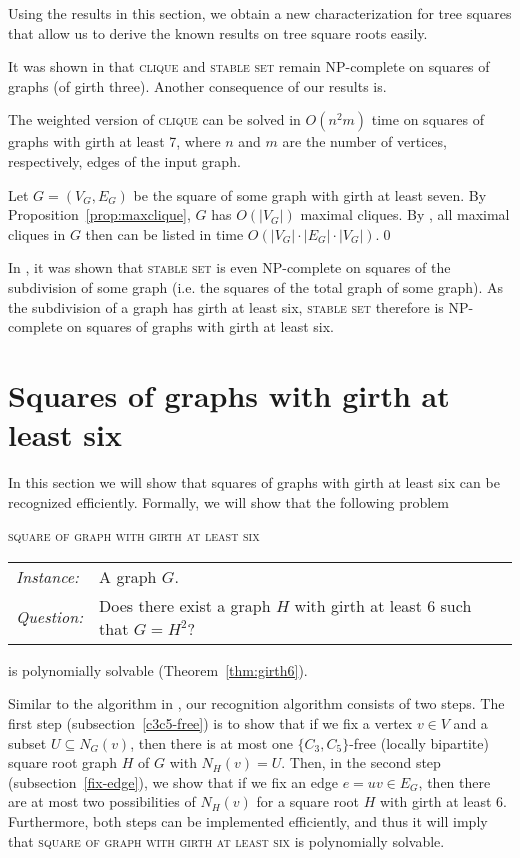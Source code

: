 \documentclass[proceedings]{stacs}
\newlength{\ai}
\begin{document}
Using the results in this section, we obtain a new characterization
for tree squares that allow us to derive the known results on tree
square roots easily.



It was shown in \cite{LinSki1995} that \textsc{clique} and \textsc{stable set} remain NP-complete on
squares of graphs (of girth three). Another consequence of our results is.

\begin{corollary}\label{coro:CLIQUE}
The weighted version of \textsc{clique} can be solved in $O(n^2m)$ time on squares of graphs
with girth at least 7, where $n$ and $m$ are the number of vertices, respectively, edges of the
input graph.
\end{corollary}
\proof Let $G=(V_G, E_G)$ be the square of some graph with girth at least seven.
By Proposition~\ref{prop:maxclique}, $G$ has $O(|V_G|)$ maximal cliques. By \cite{TIAS}, all maximal
cliques in $G$ then can be listed in time $O(|V_G|\cdot |E_G|\cdot |V_G|)$.\qed

In \cite{HorKil}, it was shown that \textsc{stable set} is even NP-complete on squares of the subdivision
of some graph (i.e. the squares of the total graph of some graph). As the subdivision of a graph has girth
at least six, \textsc{stable set} therefore is NP-complete on squares of graphs with girth at least six.


\section{Squares of graphs with girth at least six}\label{sec:girthsix}
In this section we will show that squares of graphs with girth at least six can be recognized
efficiently. Formally, we will show that the following problem


\textsc{square of graph with girth at least six}\\[1ex]
\begin{tabular}{ll}
{\em Instance:}& A graph $G$.\\
{\em Question:}& Does there exist a graph $H$ with girth at least $6$ such that $G=H^2$?\\
\end{tabular}

is polynomially solvable (Theorem~\ref{thm:girth6}).

Similar to the algorithm in \cite{Lau2006},
our recognition algorithm consists of two steps.
The first step (subsection~\ref{c3c5-free}) is
to show that if we fix a vertex $v\in V$ and a subset $U \subseteq N_G(v)$, then there is at
most one $\{C_3,C_5\}$-free (locally bipartite)
square root graph $H$ of $G$ with $N_H(v) = U$.
Then, in the second step (subsection~\ref{fix-edge}), we show that if we fix an edge $e = uv\in E_G$,
then there are at most two possibilities of $N_H(v)$ for a square root $H$ with girth at least $6$.
Furthermore, both steps can be implemented efficiently,
and thus it will imply
that \textsc{square of graph with girth at least six} is polynomially solvable.
\end{document}
